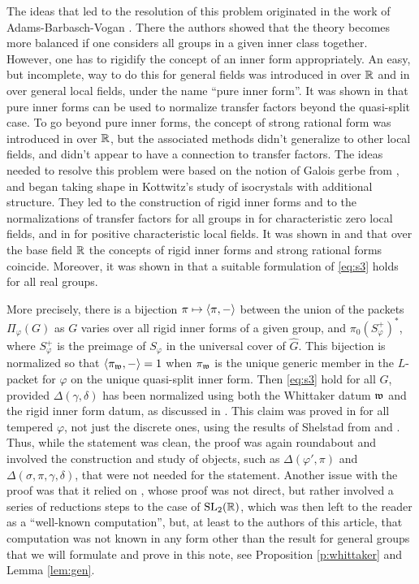 \documentclass{article}
\theoremstyle{definition}
\numberwithin{equation}{section}
\renewcommand{\-}{\hyp{}}
\begin{document}
The ideas that led to the resolution of this problem originated in the work of Adams-Barbasch-Vogan \cite{ABV92}. There the authors showed that the theory becomes more balanced if one considers all groups in a given inner class together. However, one has to rigidify the concept of an inner form appropriately. An easy, but incomplete, way to do this for general fields was introduced in \cite{ABV92} over $\mathbb{R}$ and in \cite{Vog93} over general local fields, under the name ``pure inner form''. It was shown in \cite[\S2.2]{KalECI} that pure inner forms can be used to normalize transfer factors beyond the quasi-split case. To go beyond pure inner forms, the concept of strong rational form was introduced in \cite{ABV92} over $\mathbb{R}$, but the associated methods didn't generalize to other local fields, and didn't appear to have a connection to transfer factors. The ideas needed to resolve this problem were based on the notion of Galois gerbe from \cite{LR87}, and began taking shape in Kottwitz's study \cite{Kot97} of isocrystals with additional structure. They led to the construction of rigid inner forms and to the normalizations of transfer factors for all groups in \cite{KalRI} for characteristic zero local fields, and in \cite{Dillery20} for positive characteristic local fields. It was shown in \cite[\S5.2]{KalRI} and that over the base field $\mathbb{R}$ the concepts of rigid inner forms and strong rational forms coincide. Moreover, it was shown in \cite[\S5.6]{KalRI} that a suitable formulation of \eqref{eq:s3} holds for all real groups. 

More precisely, there is a bijection $\pi \mapsto \langle\pi,-\rangle$ between the union of the packets $\Pi_\varphi(G)$ as $G$ varies over all rigid inner forms of a given group, and $\pi_0(S_\varphi^+)^*$, where $S_\varphi^+$ is the preimage of $S_\varphi$ in the universal cover of $\hat G$. This bijection is normalized so that $\langle\pi_{\mathfrak{w}},-\rangle=1$ when $\pi_{\mathfrak{w}}$ is the unique generic member in the $L$\-packet for $\varphi$ on the unique quasi-split inner form. Then \eqref{eq:s3} hold for all $G$, provided $\Delta(\gamma,\delta)$ has been normalized using both the Whittaker datum $\mathfrak{w}$ and the rigid inner form datum, as discussed in \cite[\S5.3]{KalRI}. This claim was proved in \cite[\S5.6]{KalRI} for all tempered $\varphi$, not just the discrete ones, using the results of Shelstad from \cite{SheTE2} and \cite{SheTE3}. Thus, while the statement was clean, the proof was again roundabout and involved the construction and study of objects, such as $\Delta(\varphi',\pi)$ and $\Delta(\sigma,\pi,\gamma,\delta)$, that were not needed for the statement. Another issue with the proof was that it relied on \cite[Theorem 11.5]{SheTE3}, whose proof was not direct, but rather involved a series of reductions steps to the case of $\textrm{SL}_2(\mathbb{R})$, which was then left to the reader as a ``well-known computation'', but, at least to the authors of this article, that computation was not known in any form other than the result for general groups that we will formulate and prove in this note, see Proposition \ref{p:whittaker} and Lemma \ref{lem:gen}.
\end{document}
